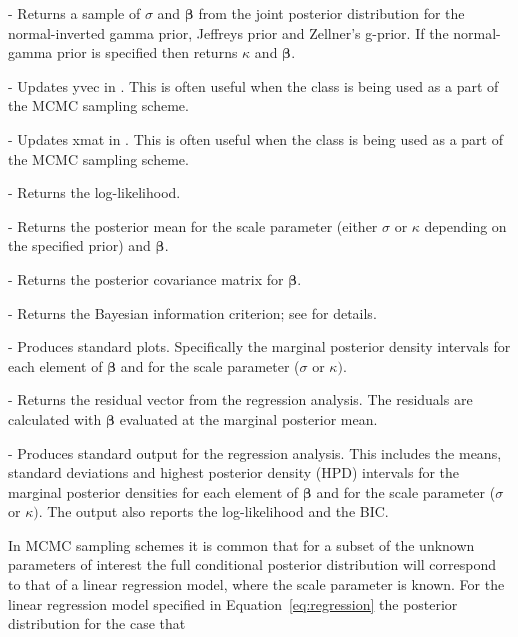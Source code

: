 \documentclass[article]{jss}
\begin{document}
\begin{description}
\item {} - Returns a sample of $\sigma$ and $\bm{\beta}$
  from the joint posterior distribution for the normal-inverted gamma
  prior, Jeffreys prior and Zellner's g-prior. If the normal-gamma
  prior is specified then  returns $\kappa$ and
  $\bm{\beta}.$
\item {} - Updates yvec in
  . This is often useful when the class is being
  used as a part of the MCMC sampling scheme.
\item {} - Updates xmat in
  . This is often useful when the class is being
  used as a part of the MCMC sampling scheme.
\item {} - Returns the log-likelihood.
\item {} - Returns the posterior mean for the
  scale parameter (either $\sigma$ or $\kappa$ depending on the
  specified prior) and $\bm{\beta}.$
\item {} - Returns the posterior
  covariance matrix for $\bm{\beta}$.
\item {} - Returns the Bayesian information criterion; see
  \cite{KassRaftery1995} for details.
\item {} - Produces standard plots.
  Specifically the marginal posterior density intervals for each
  element of $\bm{\beta}$ and for the scale parameter ($\sigma$ or
  $\kappa)$.
\item {} - Returns the residual vector from the
  regression analysis.  The residuals are calculated with $\bm{\beta}$
  evaluated at the marginal posterior mean.
\item {} - Produces standard output for the regression
  analysis.  This includes the means, standard deviations and highest
  posterior density (HPD) intervals for the marginal posterior
  densities for each element of $\bm{\beta}$ and for the scale
  parameter ($\sigma$ or $\kappa)$. The output also reports the
  log-likelihood and the BIC.
\end{description}
In MCMC sampling schemes it is common that for a subset of the unknown
parameters of interest the full conditional posterior distribution
will correspond to that of a linear regression model, where the scale
parameter is known. For the linear regression model specified in
Equation~\ref{eq:regression} the posterior distribution for the case that
\end{document}
